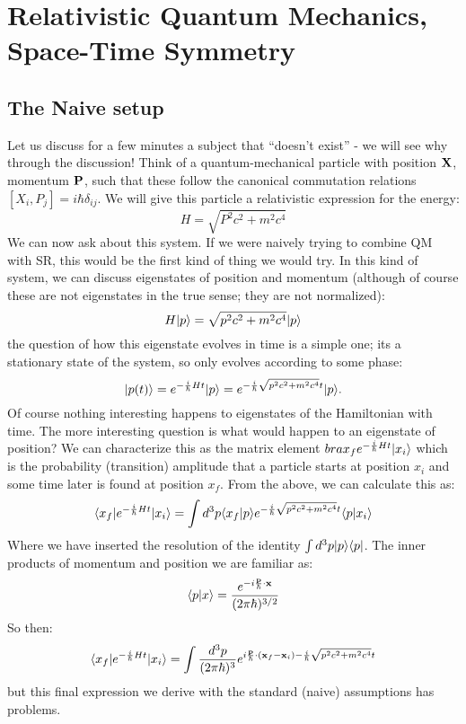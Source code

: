 \section{Relativistic Quantum Mechanics, Space-Time Symmetry}
\subsection{The Naive setup}
Let us discuss for a few minutes a subject that ``doesn't exist'' - we will see why through the discussion! Think of a quantum-mechanical particle with position $\mathbf{X}$, momentum $\mathbf{P}$, such that these follow the canonical commutation relations $[X_i, P_j] = i\hbar \delta_{ij}$. We will give this particle a relativistic expression for the energy:
\begin{equation}
    H = \sqrt{P^2c^2 + m^2c^4}
\end{equation}
We can now ask about this system. If we were naively trying to combine QM with SR, this would be the first kind of thing we would try. In this kind of system, we can discuss eigenstates of position and momentum (although of course these are not eigenstates in the true sense; they are not normalized):
\begin{equation}
    H\lvert p \rangle = \sqrt{p^2c^2 + m^2c^4}\lvert p \rangle
\end{equation}
the question of how this eigenstate evolves in time is a simple one; its a stationary state of the system, so only evolves according to some phase:
\begin{equation}
    \lvert p(t) \rangle = e^{-\frac{i}{\hbar}Ht}\lvert p \rangle = e^{-\frac{i}{\hbar}\sqrt{p^2c^2 + m^2c^4}t}\lvert p \rangle.
\end{equation}
Of course nothing interesting happens to eigenstates of the Hamiltonian with time. The more interesting question is what would happen to an eigenstate of position? We can characterize this as the matrix element $bra{x_f}e^{-\frac{i}{\hbar}Ht}\lvert x_i \rangle$ which is the probability (transition) amplitude that a particle starts at position $x_i$ and some time later is found at position $x_f$. From the above, we can calculate this as:
\begin{equation}
    \langle x_f \rvert e^{-\frac{i}{\hbar}Ht}\lvert x_i \rangle = \int d^3p \langle x_f \lvert p \rangle e^{-\frac{i}{\hbar}\sqrt{p^2c^2 + m^2c^4}t}\langle p \lvert x_i \rangle
\end{equation}
Where we have inserted the resolution of the identity $\int d^3p \lvert p \rangle \langle p \rvert$. The inner products of momentum and position we are familiar as:
\begin{equation}
    \langle p \lvert x \rangle = \frac{e^{-i\frac{\mathbf{p}}{\hbar}\cdot\mathbf{x}}}{(2\pi\hbar)^{3/2}}
\end{equation}
So then:
\begin{equation}
    \langle x_f \rvert e^{-\frac{i}{\hbar}Ht}\lvert x_i \rangle = \int \frac{d^3p}{(2\pi\hbar)^3}e^{i\frac{\mathbf{p}}{\hbar}\cdot(\mathbf{x}_f - \mathbf{x}_i) -\frac{i}{\hbar}\sqrt{p^2c^2 + m^2c^4}t}
\end{equation}
but this final expression we derive with the standard (naive) assumptions has problems. 

